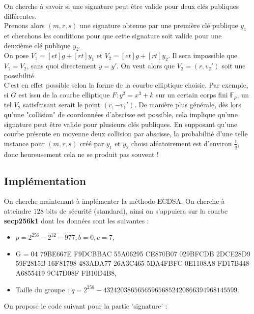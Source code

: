\documentclass{article}
\newcommand{\bF}{\mathbb{F}}
\begin{document}
On cherche à savoir si une signature peut être valide pour deux clés publiques différentes.\\
Prenons alors $(m,r,s)$ une signature obtenue par une première clé publique $y_1$ et cherchons les conditions pour que cette signature soit valide pour une deuxième clé publique $y_2$.\\
On pose $V_1 = [et]g + [rt]y_1$ et $V_2 = [et]g + [rt]y_2$. Il sera impossible que $V_1 = V_2$, sans quoi directement $y = y'$. On veut alors que $V_2 = (r,v_2')$ soit une possibilité.\\
C'est en effet possible selon la forme de la courbe elliptique choisie. Par exemple, si $G$ est issu de la courbe elliptique $F:y^2 = x^3+k$ sur un certain corps fini $\bF_p$, un tel $V_2$ satisfaisant serait le point $(r,-v_1')$. De manière plus générale, dès lors qu'une "collision" de coordonnées d'abscisse est possible, cela implique qu'une signature peut être valide pour plusieurs clés publiques. En supposant qu'une courbe présente en moyenne deux collision par abscisse, la probabilité d'une telle instance pour $(m,r,s)$ créé par $y_1$ et $y_2$ choisi aléatoirement est d'environ $\frac{1}{q}$, donc heureusement cela ne se produit pas souvent !

\subsection{Implémentation}

On cherche maintenant à implémenter la méthode ECDSA. On cherche à atteindre $128$ bits de sécurité (standard), ainsi on s'appuiera sur la courbe \textbf{secp256k1} dont les données sont les suivantes :
\begin{itemize}
    \item  $p = 2^{256} - 2^{32} - 977, b = 0, c = 7$,
    \item G =  04 79BE667E F9DCBBAC 55A06295 CE870B07 029BFCDB 2DCE28D9 59F2815B 16F81798 483ADA77 26A3C465 5DA4FBFC 0E1108A8 FD17B448 A6855419 9C47D08F FB10D4B8,
    \item Taille du groupe : $q =  2^{256} - 432420386565659656852420866394968145599$.
\end{itemize}
 
 On propose le code suivant pour la partie 'signature' :
\end{document}
